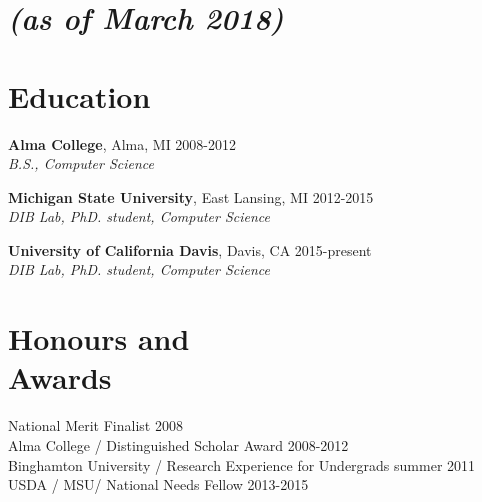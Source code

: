 \documentclass[margin,12pt]{camille_resume}
\begin{document}
\address{{\bf Permanent Address}\\
Request Only\\
Davis, CA 95618}
\address{
\hfill {\bf Contact}\\
\hfill camille.scott.w@gmail.com\\
\hfill cswel@ucdavis.edu}
\pagestyle{plain}

    
\begin{resume}



\section{\small \it{(as of March 2018)}}

    \section{\mysidestyle Education}

{\bf Alma College}, Alma, MI \hfill 2008-2012\\
{\em B.S., Computer Science}

\vspace{1mm}

{\bf Michigan State University}, East Lansing, MI \hfill 2012-2015\\
{\em DIB Lab, PhD. student, Computer Science}

\vspace{1mm}

{\bf University of California Davis}, Davis, CA \hfill 2015-present\\
{\em DIB Lab, PhD. student, Computer Science}

\vspace{2mm}

    \section{\mysidestyle Honours and\\Awards} 

National Merit Finalist \hfill 2008\\
Alma College / Distinguished Scholar Award \hfill 2008-2012\\
Binghamton University / Research Experience for Undergrads \hfill summer 2011\\
USDA / MSU/  National Needs Fellow \hfill 2013-2015\\


\end{resume}
\end{document}
